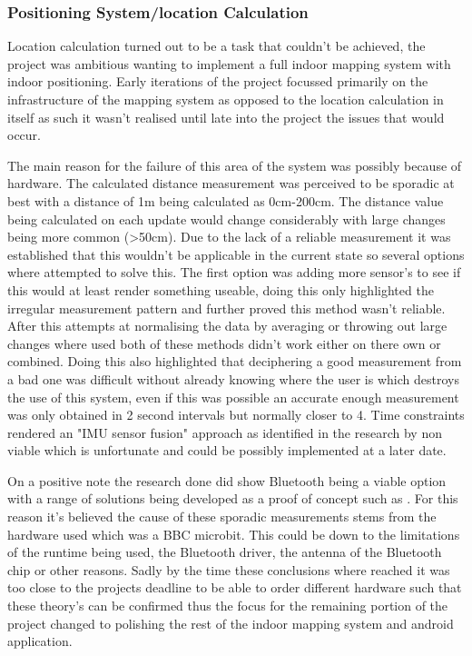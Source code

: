 \subsubsection{Positioning System/location Calculation}
Location calculation turned out to be a task that couldn't be achieved, the project was ambitious wanting to implement a full indoor mapping system with indoor positioning. Early iterations of the project focussed primarily on the infrastructure of the mapping system as opposed to the location calculation in itself as such it wasn't realised until late into the project the issues that would occur.

The main reason for the failure of this area of the system was possibly because of hardware. The calculated distance measurement was perceived to be sporadic at best with a distance of 1m being calculated as 0cm-200cm. The distance value being calculated on each update would change considerably with large changes being more common (\textgreater 50cm). Due to the lack of a reliable measurement it was established that this wouldn't be applicable in the current state so several options where attempted to solve this. The first option was adding more sensor's to see if this would at least render something useable, doing this only highlighted the irregular measurement pattern and further proved this method wasn't reliable.
After this attempts at normalising the data by averaging or throwing out large changes where used both of these methods didn't work either on there own or combined. Doing this also highlighted that deciphering a good measurement from a bad one was difficult without already knowing where the user is which destroys the use of this system, even if this was possible an accurate enough measurement was only obtained in 2 second intervals but normally closer to 4. Time constraints rendered an "IMU sensor fusion" approach as identified in the research by \cite{comer_uwb_vs_ble} non viable which is unfortunate and could be possibly implemented at a later date.

On a positive note the research done did show Bluetooth being a viable option with a range of solutions being developed as a proof of concept such as \cite{kingatua_2020_bluetooth}. For this reason it's believed the cause of these sporadic measurements stems from the hardware used which was a BBC microbit. This could be down to the limitations of the runtime being used, the Bluetooth driver, the antenna of the Bluetooth chip or other reasons. Sadly by the time these conclusions where reached it was too close to the projects deadline to be able to order different hardware such that these theory's can be confirmed thus the focus for the remaining portion of the project changed to polishing the rest of the indoor mapping system and android application.

